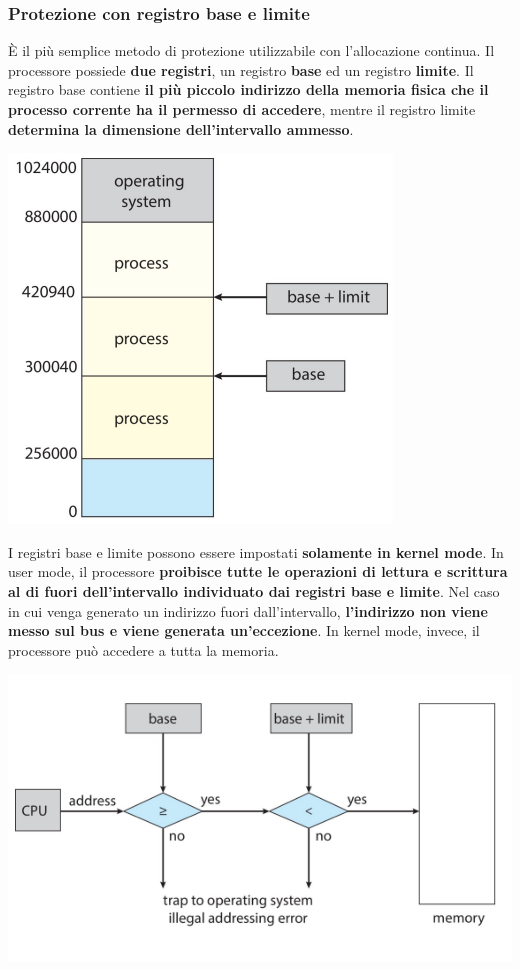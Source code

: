 \documentclass[12pt]{article}
\begin{document}
\subsubsection{Protezione con registro base e limite}
È il più semplice metodo di protezione utilizzabile con l'allocazione continua.
Il processore possiede \textbf{due registri}, un registro \textbf{base} ed un registro \textbf{limite}.
Il registro base contiene \textbf{il più piccolo indirizzo della memoria fisica che il processo corrente ha il permesso di accedere}, mentre il registro limite \textbf{determina la dimensione dell'intervallo ammesso}.
\begin{center}
    \includegraphics[width = 0.40\linewidth]{Images/54.png}
\end{center}
I registri base e limite possono essere impostati \textbf{solamente in kernel mode}. In user mode, il processore \textbf{proibisce tutte le operazioni di lettura e scrittura al di fuori dell'intervallo individuato dai registri base e limite}.
Nel caso in cui venga generato un indirizzo fuori dall'intervallo, \textbf{l'indirizzo non viene messo sul bus e viene generata un'eccezione}. In kernel mode, invece, il processore può accedere a tutta la memoria.
\begin{center}
    \includegraphics[width = 0.80\linewidth]{Images/55.png}
\end{center}
\end{document}
